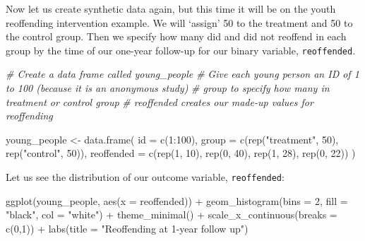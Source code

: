 \documentclass[
]{book}
\newenvironment{Shaded}{\begin{snugshade}}{\end{snugshade}}
\newcommand{\AttributeTok}[1]{\textcolor[rgb]{0.77,0.63,0.00}{#1}}
\newcommand{\CommentTok}[1]{\textcolor[rgb]{0.56,0.35,0.01}{\textit{#1}}}
\newcommand{\DecValTok}[1]{\textcolor[rgb]{0.00,0.00,0.81}{#1}}
\newcommand{\FunctionTok}[1]{\textcolor[rgb]{0.00,0.00,0.00}{#1}}
\newcommand{\NormalTok}[1]{#1}
\newcommand{\OtherTok}[1]{\textcolor[rgb]{0.56,0.35,0.01}{#1}}
\newcommand{\SpecialCharTok}[1]{\textcolor[rgb]{0.00,0.00,0.00}{#1}}
\newcommand{\StringTok}[1]{\textcolor[rgb]{0.31,0.60,0.02}{#1}}
\begin{document}
Now let us create synthetic data again, but this time it will be on the youth reoffending intervention example. We will `assign' 50 to the treatment and 50 to the control group. Then we specify how many did and did not reoffend in each group by the time of our one-year follow-up for our binary variable, \texttt{reoffended}.

\begin{Shaded}
\begin{Highlighting}[]
\CommentTok{\# Create a data frame called \textquotesingle{}young\_people\textquotesingle{}}
\CommentTok{\# Give each young person an ID of 1 to 100 (because it is an anonymous study)}
\CommentTok{\# \textquotesingle{}group\textquotesingle{} to specify how many in treatment or control group}
\CommentTok{\# \textquotesingle{}reoffended\textquotesingle{} creates our made{-}up values for reoffending}

\NormalTok{young\_people }\OtherTok{\textless{}{-}} \FunctionTok{data.frame}\NormalTok{( }
  \AttributeTok{id =} \FunctionTok{c}\NormalTok{(}\DecValTok{1}\SpecialCharTok{:}\DecValTok{100}\NormalTok{), }
  \AttributeTok{group =} \FunctionTok{c}\NormalTok{(}\FunctionTok{rep}\NormalTok{(}\StringTok{"treatment"}\NormalTok{, }\DecValTok{50}\NormalTok{), }\FunctionTok{rep}\NormalTok{(}\StringTok{"control"}\NormalTok{, }\DecValTok{50}\NormalTok{)), }
  \AttributeTok{reoffended =}  \FunctionTok{c}\NormalTok{(}\FunctionTok{rep}\NormalTok{(}\DecValTok{1}\NormalTok{, }\DecValTok{10}\NormalTok{), }\FunctionTok{rep}\NormalTok{(}\DecValTok{0}\NormalTok{, }\DecValTok{40}\NormalTok{), }\FunctionTok{rep}\NormalTok{(}\DecValTok{1}\NormalTok{, }\DecValTok{28}\NormalTok{), }\FunctionTok{rep}\NormalTok{(}\DecValTok{0}\NormalTok{, }\DecValTok{22}\NormalTok{))}
\NormalTok{)}
\end{Highlighting}
\end{Shaded}

Let us see the distribution of our outcome variable, \texttt{reoffended}:

\begin{Shaded}
\begin{Highlighting}[]
\FunctionTok{ggplot}\NormalTok{(young\_people, }\FunctionTok{aes}\NormalTok{(}\AttributeTok{x =}\NormalTok{ reoffended)) }\SpecialCharTok{+} 
  \FunctionTok{geom\_histogram}\NormalTok{(}\AttributeTok{bins =} \DecValTok{2}\NormalTok{, }\AttributeTok{fill =} \StringTok{"black"}\NormalTok{, }\AttributeTok{col =} \StringTok{"white"}\NormalTok{) }\SpecialCharTok{+} 
  \FunctionTok{theme\_minimal}\NormalTok{() }\SpecialCharTok{+} 
  \FunctionTok{scale\_x\_continuous}\NormalTok{(}\AttributeTok{breaks =} \FunctionTok{c}\NormalTok{(}\DecValTok{0}\NormalTok{,}\DecValTok{1}\NormalTok{)) }\SpecialCharTok{+} 
  \FunctionTok{labs}\NormalTok{(}\AttributeTok{title =} \StringTok{"Reoffending at 1{-}year follow up"}\NormalTok{)}
\end{Highlighting}
\end{Shaded}
\end{document}
